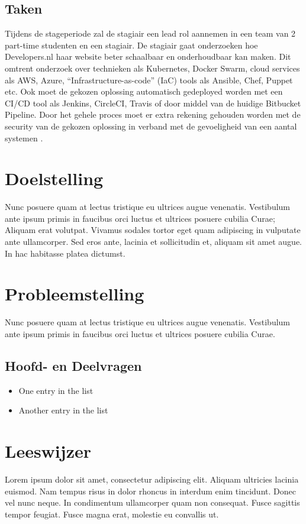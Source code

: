 

\subsection{Taken}
Tijdens de stageperiode zal de stagiair een lead rol aannemen in een team van 2 part-time studenten en een stagiair. De stagiair gaat onderzoeken hoe Developers.nl haar website beter schaalbaar en onderhoudbaar kan maken. Dit omtrent onderzoek over technieken als Kubernetes, Docker Swarm, cloud services als AWS, Azure, \enquote{Infrastructure-as-code} (IaC) tools als Ansible, Chef, Puppet etc. Ook moet de gekozen oplossing automatisch gedeployed worden met een CI/CD tool als Jenkins, CircleCI, Travis of door middel van de huidige Bitbucket Pipeline. Door het gehele proces moet er extra rekening gehouden worden met de security van de gekozen oplossing in verband met de gevoeligheid van een aantal systemen \parencite{Afstudeervoorstel}.

\pagebreak

\section{Doelstelling}

Nunc posuere quam at lectus tristique eu ultrices augue venenatis. Vestibulum ante ipsum primis in faucibus orci luctus et ultrices posuere cubilia Curae; Aliquam erat volutpat. Vivamus sodales tortor eget quam adipiscing in vulputate ante ullamcorper. Sed eros ante, lacinia et sollicitudin et, aliquam sit amet augue. In hac habitasse platea dictumst.


\section{Probleemstelling}
Nunc posuere quam at lectus tristique eu ultrices augue venenatis. Vestibulum ante ipsum primis in faucibus orci luctus et ultrices posuere cubilia Curae.

\subsection{Hoofd- en Deelvragen}
\begin{itemize}
	\item One entry in the list
	\item Another entry in the list
\end{itemize}

\section{Leeswijzer}

Lorem ipsum dolor sit amet, consectetur adipiscing elit. Aliquam ultricies lacinia euismod. Nam tempus risus in dolor rhoncus in interdum enim tincidunt. Donec vel nunc neque. In condimentum ullamcorper quam non consequat. Fusce sagittis tempor feugiat. Fusce magna erat, molestie eu convallis ut.